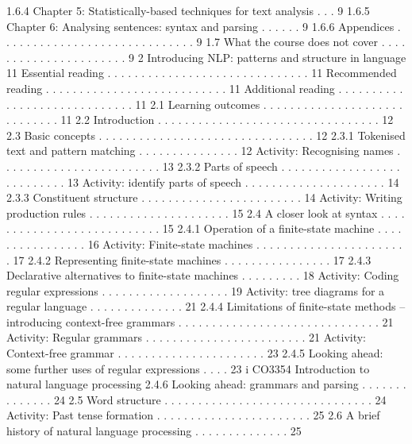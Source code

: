 1.6.4 Chapter 5: Statistically-based techniques for text analysis . . . 9
1.6.5 Chapter 6: Analysing sentences: syntax and parsing . . . . . . 9
1.6.6 Appendices . . . . . . . . . . . . . . . . . . . . . . . . . . . . . 9
1.7 What the course does not cover . . . . . . . . . . . . . . . . . . . . . . 9
2 Introducing NLP: patterns and structure in language 11
Essential reading . . . . . . . . . . . . . . . . . . . . . . . . . . . . . . 11
Recommended reading . . . . . . . . . . . . . . . . . . . . . . . . . . . 11
Additional reading . . . . . . . . . . . . . . . . . . . . . . . . . . . . . 11
2.1 Learning outcomes . . . . . . . . . . . . . . . . . . . . . . . . . . . . . 11
2.2 Introduction . . . . . . . . . . . . . . . . . . . . . . . . . . . . . . . . . 12
2.3 Basic concepts . . . . . . . . . . . . . . . . . . . . . . . . . . . . . . . . 12
2.3.1 Tokenised text and pattern matching . . . . . . . . . . . . . . . 12
Activity: Recognising names . . . . . . . . . . . . . . . . . . . . . . . . 13
2.3.2 Parts of speech . . . . . . . . . . . . . . . . . . . . . . . . . . . 13
Activity: identify parts of speech . . . . . . . . . . . . . . . . . . . . . 14
2.3.3 Constituent structure . . . . . . . . . . . . . . . . . . . . . . . . 14
Activity: Writing production rules . . . . . . . . . . . . . . . . . . . . . 15
2.4 A closer look at syntax . . . . . . . . . . . . . . . . . . . . . . . . . . . 15
2.4.1 Operation of a finite-state machine . . . . . . . . . . . . . . . . 16
Activity: Finite-state machines . . . . . . . . . . . . . . . . . . . . . . . 17
2.4.2 Representing finite-state machines . . . . . . . . . . . . . . . . 17
2.4.3 Declarative alternatives to finite-state machines . . . . . . . . . 18
Activity: Coding regular expressions . . . . . . . . . . . . . . . . . . . 19
Activity: tree diagrams for a regular language . . . . . . . . . . . . . . 21
2.4.4 Limitations of finite-state methods – introducing context-free
grammars . . . . . . . . . . . . . . . . . . . . . . . . . . . . . . 21
Activity: Regular grammars . . . . . . . . . . . . . . . . . . . . . . . . 21
Activity: Context-free grammar . . . . . . . . . . . . . . . . . . . . . . 23
2.4.5 Looking ahead: some further uses of regular expressions . . . . 23
i
CO3354 Introduction to natural language processing
2.4.6 Looking ahead: grammars and parsing . . . . . . . . . . . . . . 24
2.5 Word structure . . . . . . . . . . . . . . . . . . . . . . . . . . . . . . . 24
Activity: Past tense formation . . . . . . . . . . . . . . . . . . . . . . . 25
2.6 A brief history of natural language processing . . . . . . . . . . . . . . 25
